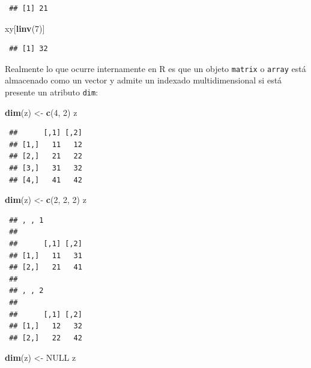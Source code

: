 \documentclass[
  spanish,
  10pt,
]{book}
\newenvironment{Shaded}{\begin{snugshade}}{\end{snugshade}}
\newcommand{\ConstantTok}[1]{\textcolor[rgb]{0.56,0.35,0.01}{#1}}
\newcommand{\DecValTok}[1]{\textcolor[rgb]{0.00,0.00,0.81}{#1}}
\newcommand{\FunctionTok}[1]{\textcolor[rgb]{0.13,0.29,0.53}{\textbf{#1}}}
\newcommand{\NormalTok}[1]{#1}
\newcommand{\OtherTok}[1]{\textcolor[rgb]{0.56,0.35,0.01}{#1}}
\theoremstyle{break}
\theoremstyle{nonumberplain}
\begin{document}
\begin{verbatim}
 ## [1] 21
\end{verbatim}

\begin{Shaded}
\begin{Highlighting}[]
\NormalTok{xy[}\FunctionTok{linv}\NormalTok{(}\DecValTok{7}\NormalTok{)]}
\end{Highlighting}
\end{Shaded}

\begin{verbatim}
 ## [1] 32
\end{verbatim}

Realmente lo que ocurre internamente en R es que un objeto \texttt{matrix} o \texttt{array} está almacenado como un vector y admite un indexado multidimensional si está presente un atributo \texttt{dim}:

\begin{Shaded}
\begin{Highlighting}[]
\FunctionTok{dim}\NormalTok{(z) }\OtherTok{\textless{}{-}} \FunctionTok{c}\NormalTok{(}\DecValTok{4}\NormalTok{, }\DecValTok{2}\NormalTok{)}
\NormalTok{z}
\end{Highlighting}
\end{Shaded}

\begin{verbatim}
 ##      [,1] [,2]
 ## [1,]   11   12
 ## [2,]   21   22
 ## [3,]   31   32
 ## [4,]   41   42
\end{verbatim}

\begin{Shaded}
\begin{Highlighting}[]
\FunctionTok{dim}\NormalTok{(z) }\OtherTok{\textless{}{-}} \FunctionTok{c}\NormalTok{(}\DecValTok{2}\NormalTok{, }\DecValTok{2}\NormalTok{, }\DecValTok{2}\NormalTok{)}
\NormalTok{z}
\end{Highlighting}
\end{Shaded}

\begin{verbatim}
 ## , , 1
 ## 
 ##      [,1] [,2]
 ## [1,]   11   31
 ## [2,]   21   41
 ## 
 ## , , 2
 ## 
 ##      [,1] [,2]
 ## [1,]   12   32
 ## [2,]   22   42
\end{verbatim}

\begin{Shaded}
\begin{Highlighting}[]
\FunctionTok{dim}\NormalTok{(z) }\OtherTok{\textless{}{-}} \ConstantTok{NULL}
\NormalTok{z}
\end{Highlighting}
\end{Shaded}
\end{document}
